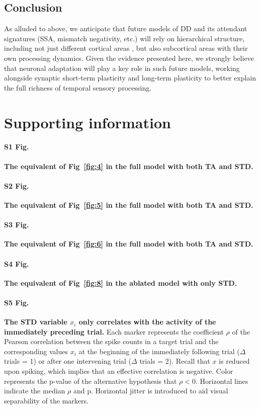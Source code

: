 \documentclass[10pt,letterpaper]{article}
\newcommand{\FIG}[1]{Fig~\ref{fig:#1}}
\begin{document}
\subsection*{Conclusion}

As alluded to above, we anticipate that future models of DD and its attendant signatures (SSA, mismatch negativity, etc.) will rely on hierarchical structure, including not just different cortical areas \cite{May2015-lt, Park2020-oa}, but also subcortical areas with their own processing dynamics. Given the evidence presented here, we strongly believe that neuronal adaptation will play a key role in such future models, working alongside synaptic short-term plasticity \cite{Yarden2017-eh} and long-term plasticity \cite{Hertag2020-kc} to better explain the full richness of temporal sensory processing.

\section*{Supporting information}

\paragraph*{S1 Fig.}\label{S1_Fig}
\textbf{The equivalent of \FIG{4} in the full model with both TA and STD.}

\paragraph*{S2 Fig.}
\label{S2_Fig}
\textbf{The equivalent of \FIG{5} in the full model with both TA and STD.}

\paragraph*{S3 Fig.}
\label{S3_Fig}
\textbf{The equivalent of \FIG{6} in the full model with both TA and STD.}

\paragraph*{S4 Fig.}
\label{S4_Fig}
\textbf{The equivalent of \FIG{8} in the ablated model with only STD.}

\paragraph*{S5 Fig.}
\label{S5_Fig}
\textbf{The STD variable $x_i$ only correlates with the activity of the immediately preceding trial.}
Each marker represents the coefficient $\rho$ of the Pearson correlation between the spike counts in a target trial and the corresponding values $x_i$ at the beginning of the immediately following trial ($\Delta$ trials = 1) or after one intervening trial ($\Delta$ trials = 2). Recall that $x$ is reduced upon spiking, which implies that an effective correlation is negative. Color represents the p-value of the alternative hypothesis that $\rho < 0$. Horizontal lines indicate the median $\rho$ and p. Horizontal jitter is introduced to aid visual separability of the markers.
\end{document}
